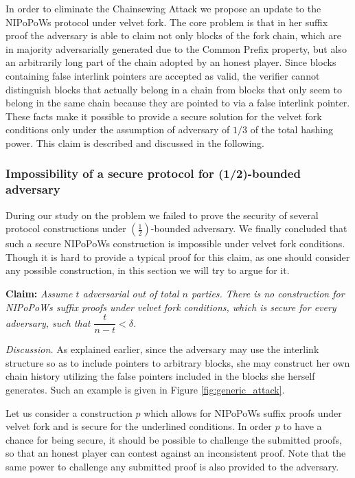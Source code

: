 In order to eliminate the Chainsewing Attack we propose an update to the NIPoPoWs
protocol under velvet fork. The core problem is that in her suffix proof the adversary
is able to claim not only blocks of the fork chain,  which are in majority adversarially
generated due to the Common Prefix property, but also an arbitrarily long part of the
chain adopted by an honest player. Since blocks containing false interlink pointers
are accepted as valid, the verifier cannot distinguish blocks that actually belong
in a chain from blocks that only seem to belong in the same chain because they are
pointed to via a false interlink pointer. \\

These facts make it possible to provide a secure solution for the velvet fork
conditions only under the assumption of adversary of $1/3$ of the total hashing
power. This claim is described and discussed in the following.

\subsubsection*{Impossibility of a secure protocol for (1/2)-bounded adversary}
During our study on the problem we failed to prove the security of several protocol
constructions under $(\frac{1}{2})$-bounded adversary. We finally concluded that
such a secure NIPoPoWs construction is impossible under velvet fork conditions.
Though it is hard to provide a typical proof for this claim, as one should consider
any possible construction, in this section we will try to argue for it.

\textbf{Claim:} \textit{Assume $t$ adversarial out of total $n$ parties. There is
no construction for NIPoPoWs suffix proofs under velvet fork conditions, which is
secure for every adversary, such that $\dfrac{t}{n-t} < \delta$.}

\textit{Discussion.} As explained earlier, since the adversary may use the interlink
structure so as to include pointers to arbitrary blocks,  she may construct her own
chain history utilizing the false pointers included in the blocks she herself generates.
Such an example is given in Figure \ref{fig:generic_attack}.

Let us consider a construction $p$ which allows for NIPoPoWs suffix proofs under velvet
fork and is secure for the underlined conditions. In order $p$ to have a chance for
being secure, it should be possible to challenge the submitted proofs, so that an
honest player can contest against an inconsistent proof. Note that the same power
to challenge any submitted proof is also provided to the adversary.

